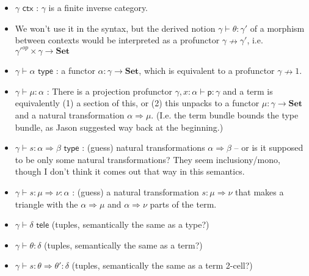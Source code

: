\documentclass[10pt]{article}
\newcommand{\yields}{\vdash}
\newcommand{\ctx}{\,\,\mathsf{ctx}}
\newcommand{\type}{\,\,\mathsf{type}}
\newcommand{\tele}{\,\,\mathsf{tele}}
\newcommand\Set[0]{\ensuremath{\textbf{Set}}}
\begin{document}
\begin{itemize}
\item $\gamma \ctx$ : $\gamma$ is a finite inverse category.  

\item We won't use it in the syntax, but the derived notion $\gamma
  \yields \theta : \gamma'$ of a morphism between contexts would be
  interpreted as a profunctor $\gamma \nrightarrow \gamma'$,
  i.e. $\gamma'^{op} \times \gamma \to \Set$

\item $\gamma \yields \alpha \type$ : a functor $\alpha : \gamma \to
  \Set$, which is equivalent to a profunctor $\gamma \nrightarrow 1$.  

\item $\gamma \yields \mu : \alpha$ : There is a projection profunctor
  $\gamma,x:\alpha \yields \mathsf{p} : \gamma$ and a term is
  equivalently (1) a section of this, or (2) this unpacks to a functor
  $\mu : \gamma \to \Set$ and a natural transformation $\alpha
  \Rightarrow \mu$.  (I.e. the term bundle bounds the type bundle, as
  Jason suggested way back at the beginning.)

\item $\gamma \yields s : \alpha \Rightarrow \beta \type$ : 
(guess) natural transformations $\alpha \Rightarrow \beta$ --
or is it supposed to be only some natural transformations? 
They seem inclusiony/mono, though I don't think it comes
out that way in this semantics.    

\item $\gamma \yields s : \mu \Rightarrow \nu : \alpha$ : (guess) a
  natural transformation $s : \mu \Rightarrow \nu$ that makes a triangle
  with the $\alpha \Rightarrow \mu$ and $\alpha \Rightarrow \nu$ parts
  of the term.

\item $\gamma \yields \delta \tele$ (tuples, semantically the same as
  a type?)
\item $\gamma \yields \theta : \delta$ (tuples, semantically the same as
  a term?)
\item $\gamma \yields s : \theta \Rightarrow \theta' : \delta$ (tuples,
  semantically the same as a term 2-cell?)
\end{itemize}
\end{document}
